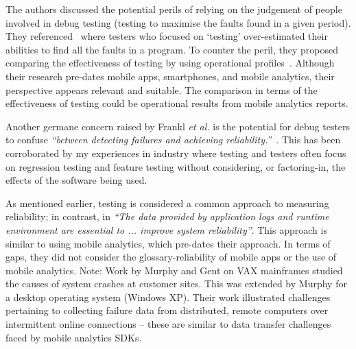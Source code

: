 The authors discussed the potential perils of relying on the judgement of people involved in debug testing (testing to maximise the faults found in a given period). They referenced~ where testers who focused on `testing' over-estimated their abilities to find all the faults in a program. To counter the peril, they proposed comparing the effectiveness of testing by using operational profiles~. Although their research pre-dates mobile apps, smartphones, and mobile analytics, their perspective appears relevant and suitable. The comparison in terms of the effectiveness of testing could be operational results from mobile analytics reports.

Another germane concern raised by Frankl \emph{et al.} is the potential for debug testers to confuse \emph{``between detecting failures and achieving reliability.''}~. This has been corroborated by my experiences in industry where testing and testers often focus on regression testing and feature testing without considering, or factoring-in, the effects of the software being used.


As mentioned earlier, testing is considered a common approach to measuring reliability; in contrast, in  \emph{``The data provided by application logs and runtime environment are essential to ... improve system reliability''}. This approach is similar to using mobile analytics, which pre-dates their approach. In terms of gaps, they did not consider the \gls{glossary-reliability} of mobile apps or the use of mobile analytics. Note: Work by Murphy and Gent on VAX mainframes studied the causes of system crashes at customer sites. This was extended by Murphy  for a desktop operating system (Windows XP). Their work illustrated challenges pertaining to collecting failure data from distributed, remote computers over intermittent online connections -- these are similar to data transfer challenges faced by mobile analytics SDKs.

